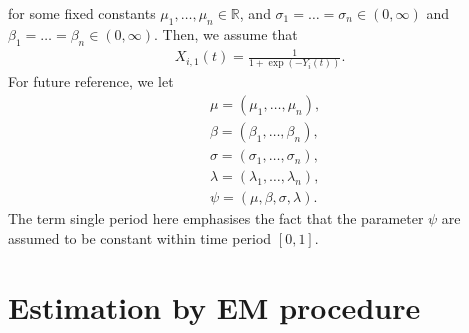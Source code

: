 \documentclass[12pt]{article}%
\begin{document}
for some fixed constants $\mu_1,\ldots, \mu_n \in \mathbb R$, and $\sigma_1 = \ldots = \sigma_n \in (0,\infty)$ and $\beta_1 = \ldots = \beta_n \in (0,\infty)$. 
Then, we assume that 
\begin{eqnarray}
X_{i,1}(t) = \frac{1}{1+\exp(-Y_i(t))}.
\end{eqnarray}
For future reference, we let
\begin{eqnarray}
&\mu = (\mu_1,\ldots, \mu_n),\\
&\beta = (\beta_1,\ldots,\beta_n),\\
&\sigma = (\sigma_1,\ldots,\sigma_n),\\
&\lambda = (\lambda_1,\ldots,\lambda_n),\\
&\psi = (\mu,\beta,\sigma,\lambda).
\end{eqnarray}
The term single period here emphasises the fact that the parameter $\psi$ 
are assumed to be constant within time period $[0,1]$. 

\section{Estimation by EM procedure}
\end{document}
